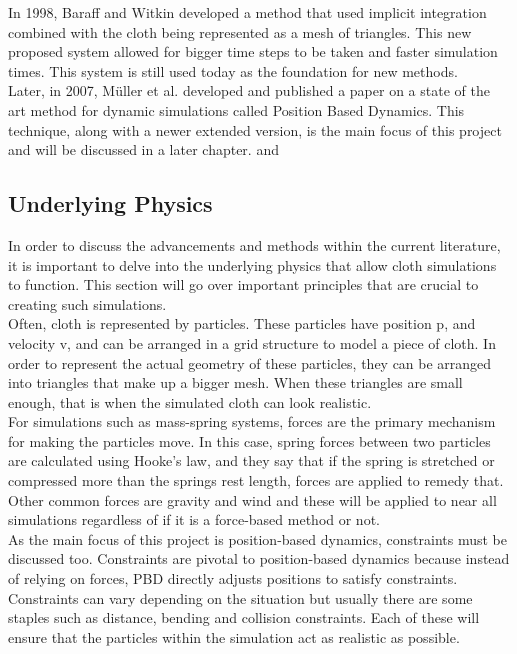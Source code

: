 \documentclass[12pt,a4paper]{article}
\begin{document}
In 1998, Baraff and Witkin developed a method that used implicit integration combined with the cloth being represented as a mesh of triangles. This new proposed system allowed for bigger time steps to be taken and faster simulation times. This system is still used today as the foundation for new methods. \cite{Baraff1998largesteps} \\

Later, in 2007, Müller et al. developed and published a paper on a state of the art method for dynamic simulations called Position Based Dynamics. This technique, along with a newer extended version, is the main focus of this project and will be discussed in a later chapter. \cite{muller2007position} and \cite{macklin2016xpbd}

\subsection{Underlying Physics}
\label{Physics}
In order to discuss the advancements and methods within the current literature, it is important to delve into the underlying physics that allow cloth simulations to function. This section will go over important principles that are crucial to creating such simulations.
\\

Often, cloth is represented by particles. These particles have position p, and velocity v, and can be arranged in a grid structure to model a piece of cloth. In order to represent the actual geometry of these particles, they can be arranged into triangles that make up a bigger mesh. When these triangles are small enough, that is when the simulated cloth can look realistic.
\\

For simulations such as mass-spring systems, forces are the primary mechanism for making the particles move. In this case, spring forces between two particles are calculated using Hooke's law, and they say that if the spring is stretched or compressed more than the springs rest length, forces are applied to remedy that. Other common forces are gravity and wind and these will be applied to near all simulations regardless of if it is a force-based method or not.
\\

As the main focus of this project is position-based dynamics, constraints must be discussed too. Constraints are pivotal to position-based dynamics because instead of relying on forces, PBD directly adjusts positions to satisfy constraints. Constraints can vary depending on the situation but usually there are some staples such as distance, bending and collision constraints. Each of these will ensure that the particles within the simulation act as realistic as possible. 
\end{document}
